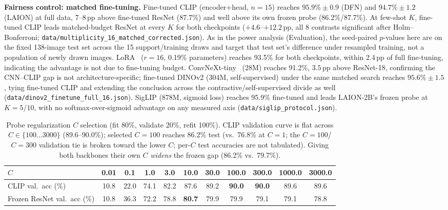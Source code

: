 \documentclass[10pt,a4paper]{article}
\begin{document}
\textbf{Fairness control: matched fine-tuning.} Fine-tuned CLIP (encoder+head, $n{=}15$) reaches $95.9\%\pm0.9$ (DFN) and $94.7\%\pm1.2$ (LAION) at full data, 7--8\,pp above fine-tuned ResNet (87.7\%) and well above its own frozen probe (86.2\%/87.7\%). At few-shot $K$, fine-tuned CLIP leads matched-budget ResNet at every $K$ for both checkpoints ($+4.6$--$+12.2$\,pp, all 8 contrasts significant after Holm--Bonferroni; \texttt{data/multiplicity\_16\_matched\_corrected.json}). As in the power analysis (Evaluation), the seed-paired $p$-values here are on the fixed 138-image test set across the 15 support/training draws and target that test set's difference under resampled training, not a population of newly drawn images. LoRA~\cite{hu2022lora} ($r{=}16$, 0.19\% parameters) reaches 93.5\% for both checkpoints, within 2.4\,pp of full fine-tuning, indicating the advantage is not due to fine-tuning budget. ConvNeXt-tiny~\cite{liu2022convnext} (28M) reaches 91.2\%, $3.5$\,pp above ResNet-18, confirming the CNN--CLIP gap is not architecture-specific; fine-tuned DINOv2 (304M, self-supervised) under the same matched search reaches $95.6\%\pm1.5$, tying fine-tuned CLIP and extending the conclusion across the contrastive/self-supervised divide as well (\texttt{data/dinov2\_finetune\_full\_16.json}). SigLIP (878M, sigmoid loss) reaches 95.9\% fine-tuned and leads LAION-2B's frozen probe at $K{=}5/10$, with no softmax-over-sigmoid advantage on any measured axis (\texttt{data/siglip\_protocol.json}).

\begin{table}[!ht]
\centering
\caption{Probe regularization $C$ selection (fit 80\%, validate 20\%, refit 100\%). CLIP validation curve is flat across $C\in\{100{\ldots}3000\}$ (89.6--90.0\%); selected $C{=}100$ reaches 86.2\% test (vs.\ 76.8\% at $C{=}1$; the $C{=}100$/$C{=}300$ validation tie is broken toward the lower $C$; per-$C$ test accuracies are not tabulated). Giving both backbones their own $C$ \emph{widens} the frozen gap (86.2\% vs.\ 79.7\%).}
\label{tab:cgrid}
{\footnotesize\setlength{\tabcolsep}{4pt}\begin{tabular}{lcccccccccc}
\toprule
$C$ & 0.01 & 0.1 & 1.0 & 3.0 & 10.0 & 30.0 & 100.0 & 300.0 & 1000.0 & 3000.0 \\
\midrule
CLIP val.\ acc (\%) & 10.8 & 22.0 & 74.1 & 82.2 & 87.6 & 89.2 & \textbf{90.0} & \textbf{90.0} & 89.6 & 89.6 \\
Frozen ResNet val.\ acc (\%) & 10.8 & 36.3 & 72.2 & 78.8 & \textbf{80.7} & 79.9 & 79.9 & 79.1 & 79.1 & 78.8 \\
\bottomrule
\end{tabular}}
\end{table}
\end{document}
